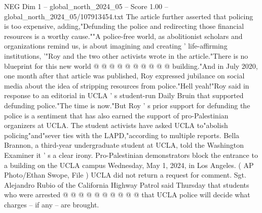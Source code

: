 \begin{textsample}{NEG Dim 1 – global\_north\_2024\_05 – Score 1.00 – global\_north\_2024\_05/107913454.txt}
The article further asserted that policing is too expensive, adding,"Defunding the police and redirecting those financial resources is a worthy cause.""A police-free world, as abolitionist scholars and organizations remind us, is about imagining and creating ' life-affirming institutions, '"Roy and the two other activists wrote in the article."There is no blueprint for this new world @ @ @ @ @ @ @ @ @ @ building."And in July 2020, one month after that article was published, Roy expressed jubilance on social media about the idea of stripping resources from police."Hell yeah!"Roy said in response to an editorial in UCLA ' s student-run Daily Bruin that supported defunding police."The time is now."But Roy ' s prior support for defunding the police is a sentiment that has also earned the support of pro-Palestinian organizers at UCLA.
The student activists have asked UCLA to"abolish policing"and"sever ties with the LAPD,"according to multiple reports.
Bella Brannon, a third-year undergraduate student at UCLA, told the Washington Examiner it ' s a clear irony.
Pro-Palestinian demonstrators block the entrance to a building on the UCLA campus Wednesday, May 1, 2024, in Los Angeles. ( AP Photo/Ethan Swope, File ) UCLA did not return a request for comment.
Sgt.
Alejandro Rubio of the California Highway Patrol said Thursday that students who were arrested @ @ @ @ @ @ @ @ @ @ that UCLA police will decide what charges -- if any -- are brought.

\end{textsample}
